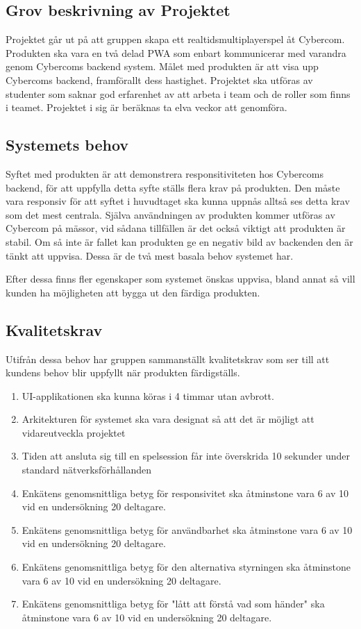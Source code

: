 \documentclass[10pt]{article}
\begin{document}
	\subsection{Grov beskrivning av Projektet}
	Projektet går ut på att gruppen skapa ett realtidsmultiplayerspel åt Cybercom. Produkten ska vara en två delad PWA som enbart kommunicerar med varandra genom Cybercoms backend system. Målet med produkten är att visa upp Cybercoms backend, framförallt dess hastighet.
	Projektet ska utföras av studenter som saknar god erfarenhet av att arbeta i team och de roller som finns i teamet. Projektet i sig är beräknas ta elva veckor att genomföra. 
	
	\subsection{Systemets behov}
	Syftet med produkten är att demonstrera responsitiviteten hos Cybercoms backend, för att uppfylla detta syfte ställs flera krav på produkten. Den måste vara responsiv för att syftet i huvudtaget ska kunna uppnås alltså ses detta krav som det mest centrala. Själva användningen av produkten kommer utföras av Cybercom på mässor, vid sådana tillfällen är det också viktigt att produkten är stabil. Om så inte är fallet kan produkten ge en negativ bild av backenden den är tänkt att uppvisa. Dessa är de två mest basala behov systemet har.
	
	Efter dessa finns fler egenskaper som systemet önskas uppvisa, bland annat så vill kunden ha möjligheten att bygga ut den färdiga produkten. 
	
	
	\subsection{Kvalitetskrav}
	Utifrån dessa behov har gruppen sammanställt kvalitetskrav som ser till att kundens behov blir uppfyllt när produkten färdigställs.
	\begin{enumerate}
		\item UI-applikationen ska kunna köras i 4 timmar utan avbrott.
		\item Arkitekturen för systemet ska vara designat så att det är möjligt att vidareutveckla projektet
		\item Tiden att ansluta sig till en spelsession får inte överskrida 10 sekunder under standard nätverksförhållanden
		\item Enkätens genomsnittliga betyg för responsivitet ska åtminstone vara 6 av 10 vid en undersökning 20 deltagare.
		\item Enkätens genomsnittliga betyg för användbarhet ska åtminstone vara 6 av 10 vid en undersökning 20 deltagare.
		\item Enkätens genomsnittliga betyg för den alternativa styrningen ska åtminstone vara 6 av 10 vid en undersökning 20 deltagare.
		\item Enkätens genomsnittliga betyg för "lått att förstå vad som händer" ska åtminstone vara 6 av 10 vid en undersökning 20 deltagare.
		
	\end{enumerate}
\end{document}
